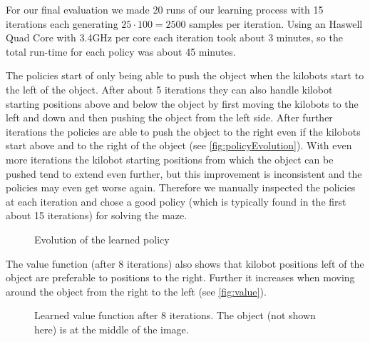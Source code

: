 \documentclass[twoside]{article}
\begin{document}
For our final evaluation we made 20 runs of our learning process with 15
iterations each generating $25 \cdot 100 = 2500$ samples per iteration. Using
an Haswell Quad Core with 3.4GHz per core each iteration took about 3 minutes,
so the total run-time for each policy was about 45 minutes.

The policies start of only being able to push the object when the kilobots start
to the left of the object. After about 5 iterations they can also handle kilobot
starting positions above and below the object by first moving the kilobots to
the left and down and then pushing the object from the left side. After further
iterations the policies are able to push the object to the right even if the
kilobots start above and to the right of the object (see
\autoref{fig:policyEvolution}). With even more iterations the kilobot starting
positions from which the object can be pushed tend to extend even further, but
this improvement is inconsistent and the policies may even get worse again.
Therefore we manually inspected the policies at each iteration and chose a good
policy (which is typically found in the first about 15 iterations) for solving
the maze.

\begin{figure}[!htb]
	\centering
    \hfill
    \hfill
    \hfill
    \hfill
	\caption[foo]{Evolution of the learned policy}
	\label{fig:policyEvolution}
\end{figure}

The value function (after 8 iterations) also shows that kilobot positions left
of the object are preferable to positions to the right. Further it increases
when moving around the object from the right to the left (see \autoref{fig:value}).

\begin{figure}[!htb]
	\centering
    \def\svgwidth{\columnwidth}
    
    \caption{Learned value function after 8 iterations. The object (not shown
             here) is at the middle of the image.}
	\label{fig:value}
\end{figure}
\end{document}
